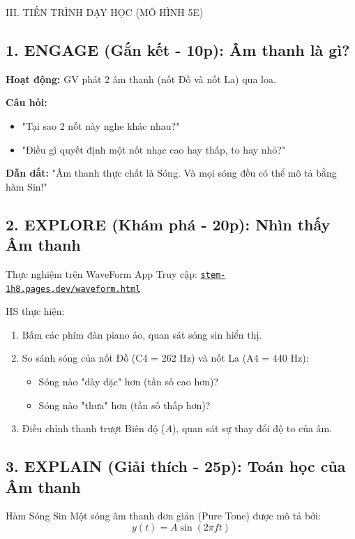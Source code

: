 \documentclass[12pt,a4paper]{article}
\begin{document}
\begin{sectionbox}{III. TIẾN TRÌNH DẠY HỌC (MÔ HÌNH 5E)}

\subsection*{1. ENGAGE (Gắn kết - 10p): Âm thanh là gì?}
\textbf{Hoạt động:} GV phát 2 âm thanh (nốt Đồ và nốt La) qua loa.

\textbf{Câu hỏi:}
\begin{itemize}
    \item "Tại sao 2 nốt này nghe khác nhau?"
    \item "Điều gì quyết định một nốt nhạc cao hay thấp, to hay nhỏ?"
\end{itemize}

\textbf{Dẫn dắt:} "Âm thanh thực chất là Sóng. Và mọi sóng đều có thể mô tả bằng hàm Sin!"

\subsection*{2. EXPLORE (Khám phá - 20p): Nhìn thấy Âm thanh}
\begin{activitybox}{Thực nghiệm trên WaveForm App}
Truy cập: \href{https://stem-1h8.pages.dev/waveform.html}{\texttt{stem-1h8.pages.dev/waveform.html}}

HS thực hiện:
\begin{enumerate}
    \item Bấm các phím đàn piano ảo, quan sát sóng sin hiển thị.
    \item So sánh sóng của nốt Đồ (C4 = 262 Hz) và nốt La (A4 = 440 Hz):
    \begin{itemize}
        \item Sóng nào "dày đặc" hơn (tần số cao hơn)?
        \item Sóng nào "thưa" hơn (tần số thấp hơn)?
    \end{itemize}
    \item Điều chỉnh thanh trượt Biên độ ($A$), quan sát sự thay đổi độ to của âm.
\end{enumerate}
\end{activitybox}

\subsection*{3. EXPLAIN (Giải thích - 25p): Toán học của Âm thanh}
\begin{mathbox}{Hàm Sóng Sin}
Một sóng âm thanh đơn giản (Pure Tone) được mô tả bởi:
$$ y(t) = A \sin(2\pi f t) $$


\end{mathbox}
\end{sectionbox}
\end{document}
